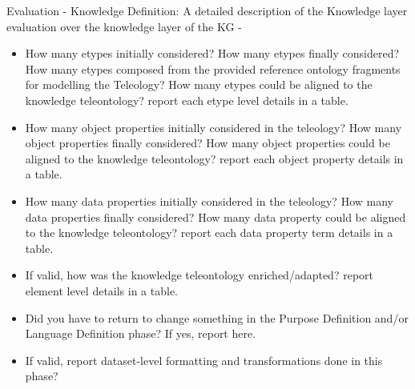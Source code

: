 Evaluation - Knowledge Definition: A detailed description of the Knowledge layer evaluation over the knowledge layer of the KG -
\begin{itemize}
    \item How many etypes initially considered? How many etypes finally considered? How many etypes composed from the provided reference ontology fragments for modelling the Teleology? How many etypes could be aligned to the  knowledge teleontology? report each etype level details in a table.
    \item How many object properties initially considered in the teleology? How many object properties finally considered? How many object properties could be aligned to the knowledge teleontology? report each object property details in a table.
    \item How many data properties initially considered in the teleology? How many data properties finally considered?  How many data property could be aligned to the knowledge teleontology? report each data property term details in a table.
    \item If valid, how was the knowledge teleontology enriched/adapted? report element level details in a table.
    \item Did you have to return to change something in the Purpose Definition and/or Language Definition phase? If yes, report here.
    \item If valid, report dataset-level formatting and transformations done in this phase?
\end{itemize}